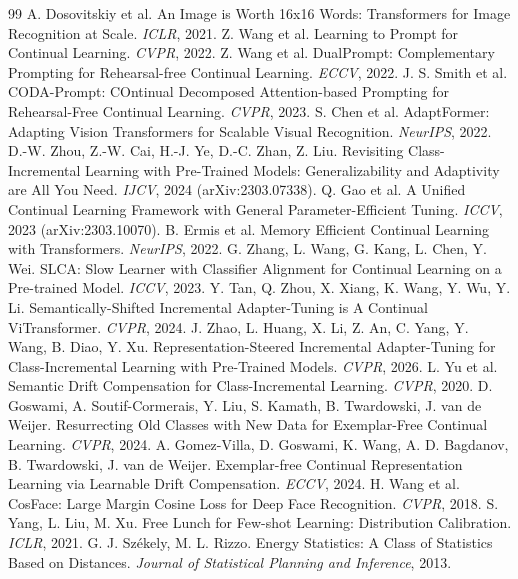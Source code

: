 \documentclass[11pt]{article}
\begin{document}
\begin{thebibliography}{99}
 A. Dosovitskiy et al. An Image is Worth 16x16 Words: Transformers for Image Recognition at Scale.
  \emph{ICLR}, 2021.
 Z. Wang et al. Learning to Prompt for Continual Learning. \emph{CVPR}, 2022.
 Z. Wang et al. DualPrompt: Complementary Prompting for Rehearsal-free Continual Learning.
  \emph{ECCV}, 2022.
 J. S. Smith et al. CODA-Prompt: COntinual Decomposed Attention-based Prompting for Rehearsal-Free
  Continual Learning. \emph{CVPR}, 2023.
 S. Chen et al. AdaptFormer: Adapting Vision Transformers for Scalable Visual Recognition.
  \emph{NeurIPS}, 2022.
 D.-W. Zhou, Z.-W. Cai, H.-J. Ye, D.-C. Zhan, Z. Liu. Revisiting Class-Incremental Learning with
  Pre-Trained Models: Generalizability and Adaptivity are All You Need. \emph{IJCV}, 2024 (arXiv:2303.07338).
 Q. Gao et al. A Unified Continual Learning Framework with General Parameter-Efficient Tuning. \emph{ICCV},
  2023 (arXiv:2303.10070).
 B. Ermis et al. Memory Efficient Continual Learning with Transformers. \emph{NeurIPS}, 2022.
 G. Zhang, L. Wang, G. Kang, L. Chen, Y. Wei. SLCA: Slow Learner with Classifier Alignment for Continual
  Learning on a Pre-trained Model. \emph{ICCV}, 2023.
 Y. Tan, Q. Zhou, X. Xiang, K. Wang, Y. Wu, Y. Li. Semantically-Shifted Incremental Adapter-Tuning is A
  Continual ViTransformer. \emph{CVPR}, 2024.
 J. Zhao, L. Huang, X. Li, Z. An, C. Yang, Y. Wang, B. Diao, Y. Xu. Representation-Steered Incremental
  Adapter-Tuning for Class-Incremental Learning with Pre-Trained Models. \emph{CVPR}, 2026.
 L. Yu et al. Semantic Drift Compensation for Class-Incremental Learning. \emph{CVPR}, 2020.
 D. Goswami, A. Soutif-Cormerais, Y. Liu, S. Kamath, B. Twardowski, J. van de Weijer. Resurrecting Old
  Classes with New Data for Exemplar-Free Continual Learning. \emph{CVPR}, 2024.
 A. Gomez-Villa, D. Goswami, K. Wang, A. D. Bagdanov, B. Twardowski, J. van de Weijer. Exemplar-free
  Continual Representation Learning via Learnable Drift Compensation. \emph{ECCV}, 2024.
 H. Wang et al. CosFace: Large Margin Cosine Loss for Deep Face Recognition. \emph{CVPR}, 2018.
 S. Yang, L. Liu, M. Xu. Free Lunch for Few-shot Learning: Distribution Calibration. \emph{ICLR},
  2021.
 G. J. Székely, M. L. Rizzo. Energy Statistics: A Class of Statistics Based on Distances. \emph{Journal
  of Statistical Planning and Inference}, 2013.
\end{thebibliography}
\end{document}
